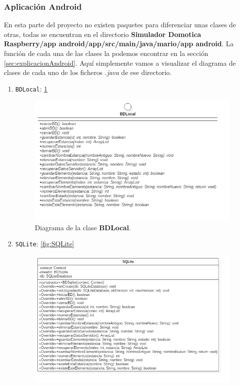 \subsubsection{Aplicación Android}

En esta parte del proyecto no existen paquetes para diferenciar unas clases de otras, todas se encuentran en el directorio \textbf{Simulador Domotica Raspberry/app android/app/src/main/java/mario/app android}. La función de cada una de las clases la podemos encontrar en la sección \ref{sec:explicacionAndroid}. Aquí simplemente vamos a visualizar el diagrama de clases de cada uno de los ficheros \textit{.java} de ese directorio.

\begin{enumerate}
	\item \verb|BDLocal|: \ref{fig:BDLocal}
	\begin{figure}[h!]
		\centering
		\includegraphics[width=1.1\linewidth]{img/BDLocal}
		\caption{Diagrama de la clase \textbf{BDLocal}.}
		\label{fig:BDLocal}
	\end{figure}
	\item \verb|SQLite|: \ref{fig:SQLite}
	\begin{figure}[h!]
		\centering
		\includegraphics[width=1.1\linewidth]{img/SQLite}

\end{figure}
\end{enumerate}
